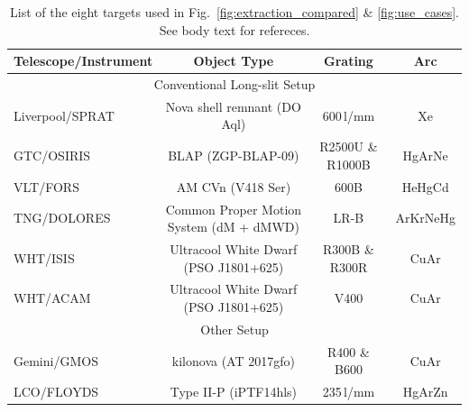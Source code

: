 \documentclass[linenumbers, twocolumn]{aastex631}
\begin{document}
\begin{table}
    \centering
    \begin{tabular}{l|c|c|c}\hline
        Telescope/Instrument & Object Type                                 & Grating             & Arc \\\hline\hline
        \multicolumn{4}{c}{Conventional Long-slit Setup}\\\hline
        Liverpool/SPRAT      & Nova shell remnant (DO Aql)                 & 600\,l/mm           & Xe \\
        GTC/OSIRIS           & BLAP (ZGP-BLAP-09)                          & R2500U \& R1000B    & HgArNe \\
        VLT/FORS             & AM CVn (V418 Ser)                           & 600B                & HeHgCd \\
        TNG/DOLORES          & Common Proper Motion System (dM + dMWD)     & LR-B                & ArKrNeHg \\
        WHT/ISIS             & Ultracool White Dwarf (PSO J1801+625)       & R300B \& R300R      & CuAr \\
        WHT/ACAM             & Ultracool White Dwarf (PSO J1801+625)       & V400                & CuAr \\\hline
        \multicolumn{4}{c}{Other Setup}\\\hline
        Gemini/GMOS          & kilonova (AT 2017gfo)                       & R400 \& B600        & CuAr \\
        LCO/FLOYDS           & Type II-P (iPTF14hls)                       & 235\,l/mm           & HgArZn \\\hline
\end{tabular}
    \caption{List of the eight targets used in Fig.~\ref{fig:extraction_compared} \& \ref{fig:use_cases}. See body text for refereces.}
    \label{tab:my_label}
\end{table}
\end{document}

